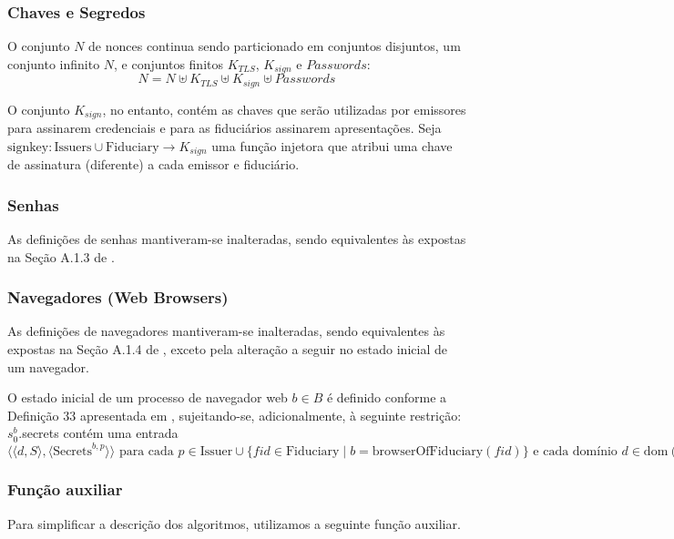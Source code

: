 \subsubsection{Chaves e Segredos}
O conjunto $N$ de nonces continua sendo particionado em conjuntos disjuntos, um conjunto infinito $N$, e conjuntos finitos $K_{TLS}$, $K_{sign}$ e $Passwords$:
\[
N = N \uplus K_{TLS} \uplus K_{sign} \uplus Passwords
\]

O conjunto $K_{sign}$, no entanto, contém as chaves que serão utilizadas por emissores para assinarem credenciais e para as fiduciários assinarem apresentações. Seja $\text{signkey} : \text{Issuers} \cup \text{Fiduciary} \rightarrow K_{sign}$ uma função injetora que atribui uma chave de assinatura (diferente) a cada emissor e fiduciário.

\subsubsection{Senhas}

As definições de senhas mantiveram-se inalteradas, sendo equivalentes às expostas na Seção A.1.3 de \cite{hauck2023openid}.

\subsubsection{Navegadores (Web Browsers)}

As definições de navegadores mantiveram-se inalteradas, sendo equivalentes às expostas na Seção A.1.4 de \cite{hauck2023openid}, exceto pela alteração a seguir no estado inicial de um navegador.

\begin{definicao}
O estado inicial de um processo de navegador web $b \in B$ é definido conforme a Definição 33 apresentada em \cite{hauck2023openid}, sujeitando-se, adicionalmente, à seguinte restrição:
$s_0^b$.secrets contém uma entrada $\langle\langle d, S \rangle, \langle \text{Secrets}^{b,p} \rangle\rangle \text{ para cada } p \in \text{Issuer} \cup \{ fid \in \text{Fiduciary} \mid b = \text{browserOfFiduciary}(fid) \} \text{ e cada domínio } d \in \text{dom}(p)$
\end{definicao}

\subsubsection{Função auxiliar}
Para simplificar a descrição dos algoritmos, utilizamos a seguinte função auxiliar.

